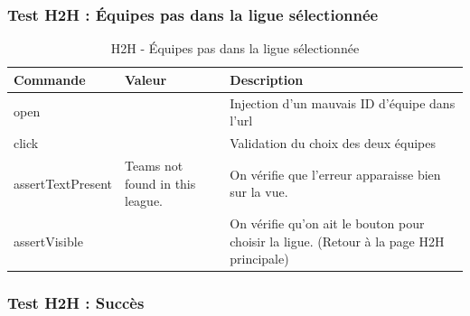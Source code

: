 \documentclass[a4paper,14pt]{extarticle}
\begin{document}
{\subsubsection{Test H2H : Équipes pas dans la ligue sélectionnée}

\begin{table}[htp]
    \centering
    \begin{tabular}{|m{4cm}|m{4cm}|m{6cm}|}
    \hline
    \textbf{Commande} & \textbf{Valeur} & \textbf{Description}                                                                                                                              \\ \hline
    open              &                 & Injection d'un mauvais ID d'équipe dans l'url \\ \hline
    click             &                 & Validation du choix des deux équipes                                                                                                   \\ \hline
    assertTextPresent & Teams not found in this league. & On vérifie que l'erreur apparaisse bien sur la vue.                                                           \\ \hline
    assertVisible     &                 & On vérifie qu'on ait le bouton pour choisir la ligue. (Retour à la page H2H principale)                                                           \\ \hline
    \end{tabular}
    \label{tab:H2HEquipePasDansLigue}
    \caption{H2H - Équipes pas dans la ligue sélectionnée}
\end{table}

\newpage

\subsubsection{Test H2H : Succès}

}
\end{document}
